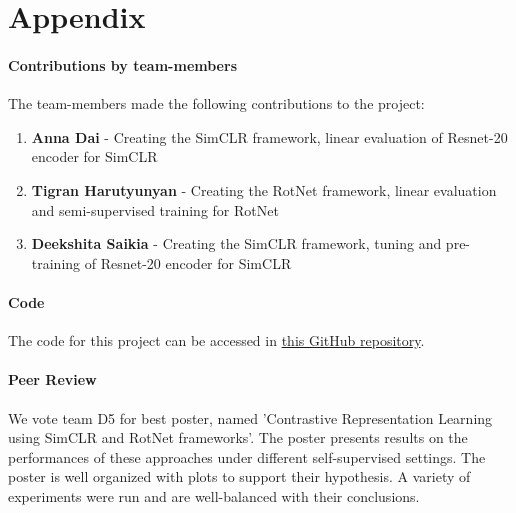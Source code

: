 \appendix
\section{Appendix}

\paragraph{Contributions by team-members} The team-members made the following contributions to the project:

\begin{enumerate}
    \item \textbf{Anna Dai} - Creating the SimCLR framework, linear evaluation of Resnet-20 encoder for SimCLR
    \item \textbf{Tigran Harutyunyan} - Creating the RotNet framework, linear evaluation and semi-supervised training for RotNet
    \item \textbf{Deekshita Saikia} - Creating the SimCLR framework, tuning and pre-training of Resnet-20 encoder for SimCLR
\end{enumerate}

\paragraph{Code} The code for this project can be accessed in \href{https://github.com/dai-anna/SemiSupervisedBenchmarking}{this GitHub repository}.

\paragraph{Peer Review} We vote team D5 for best poster, named 'Contrastive Representation Learning using SimCLR and RotNet frameworks'. The poster presents results on the performances of these approaches under different self-supervised settings. The poster is well organized with plots to support their hypothesis. A variety of experiments were run and are well-balanced with their conclusions.

